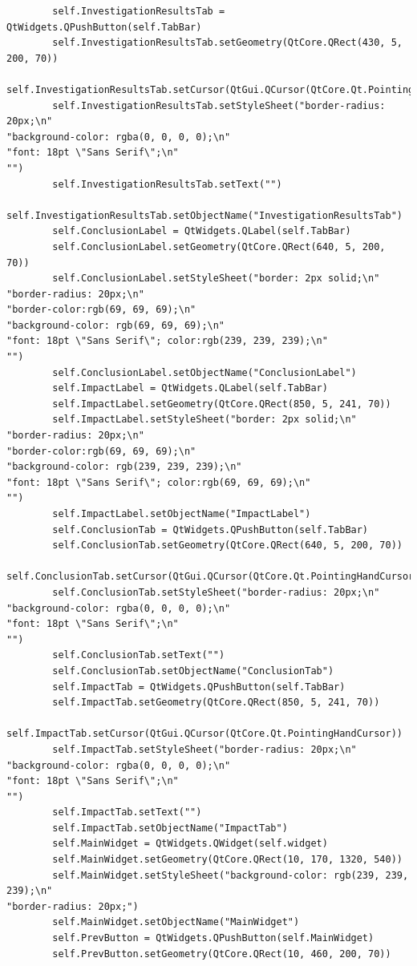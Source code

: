 \documentclass{article}
\begin{document}
\begin{lstlisting}
        self.InvestigationResultsTab = QtWidgets.QPushButton(self.TabBar)
        self.InvestigationResultsTab.setGeometry(QtCore.QRect(430, 5, 200, 70))
        self.InvestigationResultsTab.setCursor(QtGui.QCursor(QtCore.Qt.PointingHandCursor))
        self.InvestigationResultsTab.setStyleSheet("border-radius: 20px;\n"
"background-color: rgba(0, 0, 0, 0);\n"
"font: 18pt \"Sans Serif\";\n"
"")
        self.InvestigationResultsTab.setText("")
        self.InvestigationResultsTab.setObjectName("InvestigationResultsTab")
        self.ConclusionLabel = QtWidgets.QLabel(self.TabBar)
        self.ConclusionLabel.setGeometry(QtCore.QRect(640, 5, 200, 70))
        self.ConclusionLabel.setStyleSheet("border: 2px solid;\n"
"border-radius: 20px;\n"
"border-color:rgb(69, 69, 69);\n"
"background-color: rgb(69, 69, 69);\n"
"font: 18pt \"Sans Serif\"; color:rgb(239, 239, 239);\n"
"")
        self.ConclusionLabel.setObjectName("ConclusionLabel")
        self.ImpactLabel = QtWidgets.QLabel(self.TabBar)
        self.ImpactLabel.setGeometry(QtCore.QRect(850, 5, 241, 70))
        self.ImpactLabel.setStyleSheet("border: 2px solid;\n"
"border-radius: 20px;\n"
"border-color:rgb(69, 69, 69);\n"
"background-color: rgb(239, 239, 239);\n"
"font: 18pt \"Sans Serif\"; color:rgb(69, 69, 69);\n"
"")
        self.ImpactLabel.setObjectName("ImpactLabel")
        self.ConclusionTab = QtWidgets.QPushButton(self.TabBar)
        self.ConclusionTab.setGeometry(QtCore.QRect(640, 5, 200, 70))
        self.ConclusionTab.setCursor(QtGui.QCursor(QtCore.Qt.PointingHandCursor))
        self.ConclusionTab.setStyleSheet("border-radius: 20px;\n"
"background-color: rgba(0, 0, 0, 0);\n"
"font: 18pt \"Sans Serif\";\n"
"")
        self.ConclusionTab.setText("")
        self.ConclusionTab.setObjectName("ConclusionTab")
        self.ImpactTab = QtWidgets.QPushButton(self.TabBar)
        self.ImpactTab.setGeometry(QtCore.QRect(850, 5, 241, 70))
        self.ImpactTab.setCursor(QtGui.QCursor(QtCore.Qt.PointingHandCursor))
        self.ImpactTab.setStyleSheet("border-radius: 20px;\n"
"background-color: rgba(0, 0, 0, 0);\n"
"font: 18pt \"Sans Serif\";\n"
"")
        self.ImpactTab.setText("")
        self.ImpactTab.setObjectName("ImpactTab")
        self.MainWidget = QtWidgets.QWidget(self.widget)
        self.MainWidget.setGeometry(QtCore.QRect(10, 170, 1320, 540))
        self.MainWidget.setStyleSheet("background-color: rgb(239, 239, 239);\n"
"border-radius: 20px;")
        self.MainWidget.setObjectName("MainWidget")
        self.PrevButton = QtWidgets.QPushButton(self.MainWidget)
        self.PrevButton.setGeometry(QtCore.QRect(10, 460, 200, 70))

\end{lstlisting}
\end{document}
